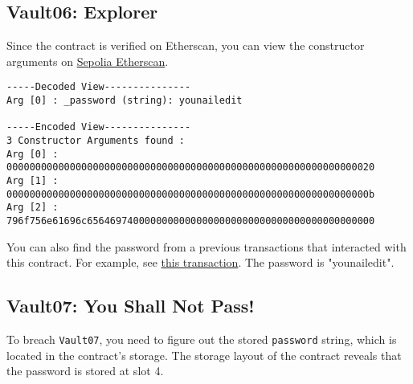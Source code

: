 \documentclass[12pt]{article}
\begin{document}
\subsection*{Vault06: Explorer}
Since the contract is verified on Etherscan, you can view the constructor arguments on \href{https://sepolia.etherscan.io/address/0xA3a763bF62550511A0E485d6EB16c98937609A32\#code}{Sepolia Etherscan}.

\begin{verbatim}
-----Decoded View---------------
Arg [0] : _password (string): younailedit

-----Encoded View---------------
3 Constructor Arguments found :
Arg [0] : 0000000000000000000000000000000000000000000000000000000000000020
Arg [1] : 000000000000000000000000000000000000000000000000000000000000000b
Arg [2] : 796f756e61696c65646974000000000000000000000000000000000000000000
\end{verbatim}

You can also find the password from a previous transactions that interacted with this contract. For example, see \href{https://sepolia.etherscan.io/inputdatadecoder?tx=0xc1f544372d0e732537a72f5e6fba05ad2ef2346695519416bedd8f37d2f17a57}{this transaction}. The password is "younailedit".

\subsection*{Vault07: You Shall Not Pass!}

To breach \texttt{Vault07}, you need to figure out the stored \texttt{password} string, which is located in the contract's storage. The storage layout of the contract reveals that the password is stored at slot 4.
\end{document}
